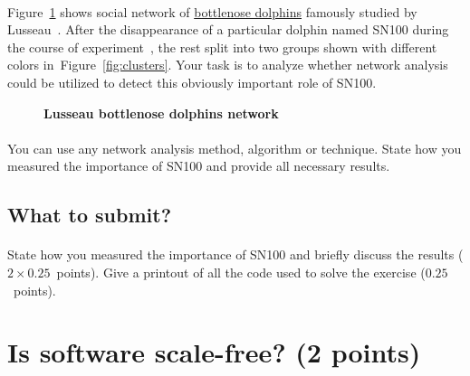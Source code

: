 \documentclass[11pt,a4paper]{article}
\newcommand{\points}[1]{({\color{magenta}$#1$~points})}
\newcommand{\totals}[1]{({\color{magenta}#1 points})}
\newcommand{\figref}[1]{{\color{LimeGreen}Figure~\ref{fig:#1}}}
\begin{document}
\paragraph{} \figref{dolphins} shows social network of \href{http://lovro.lpt.fri.uni-lj.si/ina/nets/dolphins}{bottlenose dolphins} famously studied by Lusseau~\cite{LSBHSD03}. After the disappearance of a particular dolphin named SN100 during the course of experiment~\cite{LN04}, the rest split into two groups shown with different colors in~\figref{clusters}. Your task is to analyze whether network analysis could be utilized to detect this obviously important role of SN100. 

\begin{figure}[h] \centering
	\caption{{\bf Lusseau bottlenose dolphins network}}
	\label{fig:dolphins}
\end{figure}

\paragraph{} You can use any network analysis method, algorithm or technique. State how you measured the importance of SN100 and provide all necessary results.

\subsection*{What to submit?}

\paragraph{} State how you measured the importance of SN100 and briefly discuss the results \points{2\times 0.25}. Give a printout of all the code used to solve the exercise \points{0.25}.

\section{Is software scale-free? \totals{2}}
\end{document}
